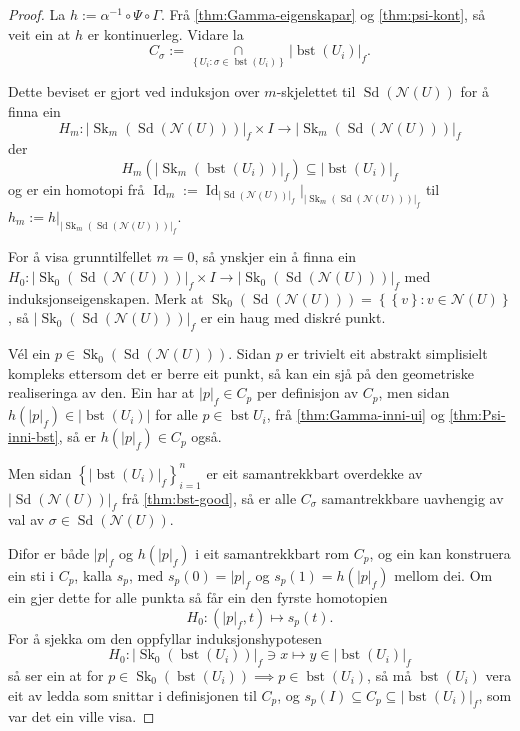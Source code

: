 \documentclass[a4paper, 12pt, norsk]{article}
\theoremstyle{plain}
\theoremstyle{definition}
\newcommand{\Nc}{\mathcal{N}}
\newcommand{\intersect}{ \mathop{\cap}\limits }
\newcommand{\gr}[1]{ \lvert #1 \rvert } %
\newcommand{\set}[1]{ \left\{ #1 \right\} } %
\DeclareMathOperator{\Sd}{Sd} %
\DeclareMathOperator{\bst}{bst} %
\DeclareMathOperator{\Sk}{Sk} %
\DeclareMathOperator{\Id}{Id} %
\begin{document}
\begin{proof}
	La \( h := \alpha^{-1} \circ \Psi \circ \Gamma \). Frå \autoref{thm:Gamma-eigenskapar} og \autoref{thm:psi-kont}, så veit ein at \( h \) er kontinuerleg. Vidare la 
	\[ 
		C_\sigma := \intersect_{\set{ U_i : \sigma \in \bst(U_i) }} \gr{\bst(U_i)}_f.
	\]

	Dette beviset er gjort ved induksjon over \( m \)-skjelettet til \( \Sd(\Nc(U)) \) for å finna ein 
	\[ 
		H_m : \gr{\Sk_m(\Sd(\Nc(U)))}_f \times I \to \gr{\Sk_m(\Sd(\Nc(U)))}_f
	\]
	der 
	\[
		H_m(\gr{\Sk_m(\bst(U_i))}_f) \subseteq \gr{\bst(U_i)}_f
	\]
	og er ein homotopi frå \( \Id_m := \Id_{\gr{\Sd(\Nc(U))}_f}|_{\gr{\Sk_m(\Sd(\Nc(U)))}_f} \) til \( h_m := h|_{\gr{\Sk_m(\Sd(\Nc(U)))}_f} \).

	For å visa grunntilfellet \( m = 0 \), så ynskjer ein å finna ein \( H_0: \gr{\Sk_0(\Sd(\Nc(U)))}_f \times I \to \gr{\Sk_0(\Sd(\Nc(U)))}_f \) med induksjonseigenskapen. Merk at \( \Sk_0(\Sd(\Nc(U))) = \set{\set{v} : v \in \Nc(U)} \), så \( \gr{\Sk_0(\Sd(\Nc(U)))}_f \) er ein haug med diskré punkt.

	Vél ein \( p \in \Sk_0(\Sd(\Nc(U))) \). Sidan \( p \) er trivielt eit abstrakt simplisielt kompleks ettersom det er berre eit punkt, så kan ein sjå på den geometriske realiseringa av den. Ein har at \( \gr{p}_f \in C_p \) per definisjon av \( C_p \), men sidan \( h(\gr{p}_f) \in \gr{\bst(U_i)} \) for alle \( p \in \bst{U_i} \), frå \autoref{thm:Gamma-inni-ui} og \autoref{thm:Psi-inni-bst}, så er \( h(\gr{p}_f) \in C_p \) også.

	Men sidan \( \set{\gr{\bst(U_i)}_f}_{i = 1}^{n} \) er eit samantrekkbart overdekke av \( \gr{\Sd(\Nc(U))}_f \) frå \autoref{thm:bst-good}, så er alle \( C_\sigma \) samantrekkbare uavhengig av val av \( \sigma \in \Sd(\Nc(U)) \).

	Difor er både \( \gr{p}_f \) og \( h(\gr{p}_f) \) i eit samantrekkbart rom \( C_p \), og ein kan konstruera ein sti i \( C_p \), kalla \( s_p \), med \( s_p(0) = \gr{p}_f \) og \( s_p(1) = h(\gr{p}_f) \) mellom dei. Om ein gjer dette for alle punkta så får ein den fyrste homotopien
	\[
		H_0 : (\gr{p}_f, t) \mapsto s_p(t).
	\]
	For å sjekka om den oppfyllar induksjonshypotesen
	\[
		H_0: \gr{\Sk_0(\bst(U_i))}_f \ni x \mapsto y \in \gr{\bst(U_i)}_f
	\]
	så ser ein at for \( p \in \Sk_0(\bst(U_i)) \implies p \in \bst(U_i) \), så må \( \bst(U_i) \) vera eit av ledda som snittar i definisjonen til \( C_p \), og \( s_p(I) \subseteq C_p \subseteq \gr{\bst(U_i)}_f \), som var det ein ville visa.


\end{proof}
\end{document}
